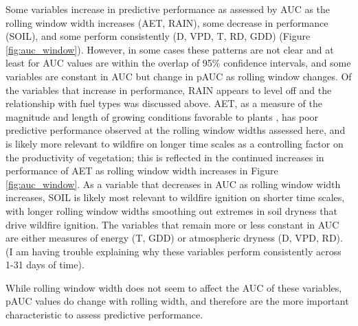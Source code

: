 \documentclass[11p]{article}
\begin{document}
\begin{table}
{Some variables increase in predictive performance as assessed by AUC as the rolling window width increases (AET, RAIN), some decrease in performance (SOIL), and some perform consistently (D, VPD, T, RD, GDD) (Figure \ref{fig:auc_window}). However, in some cases these patterns are not clear and at least for AUC values are within the overlap of 95\% confidence intervals, and some variables are constant in AUC but change in pAUC as rolling window changes. Of the variables that increase in performance, RAIN appears to level off and the relationship with fuel types was discussed above. AET, as a measure of the magnitude and length of growing conditions favorable to plants \citep{stephensonActualEvapotranspirationDeficit1998}, has poor predictive performance observed at the rolling window widths assessed here, and is likely more relevant to wildfire on longer time scales as a controlling factor on the productivity of vegetation; this is reflected in the continued increases in performance of AET as rolling window width increases in Figure \ref{fig:auc_window}. As a variable that decreases in AUC as rolling window width increases, SOIL is likely most relevant to wildfire ignition on shorter time scales, with longer rolling window widths smoothing out extremes in soil dryness that drive wildfire ignition. The variables that remain more or less constant in AUC are either measures of energy (T, GDD) or atmospheric dryness (D, VPD, RD). (I am having trouble explaining why these variables perform consistently across 1-31 days of time).

While rolling window width does not seem to affect the AUC of these variables, pAUC values do change with rolling width, and therefore are the more important characteristic to assess predictive performance.


}
\end{table}
\end{document}
